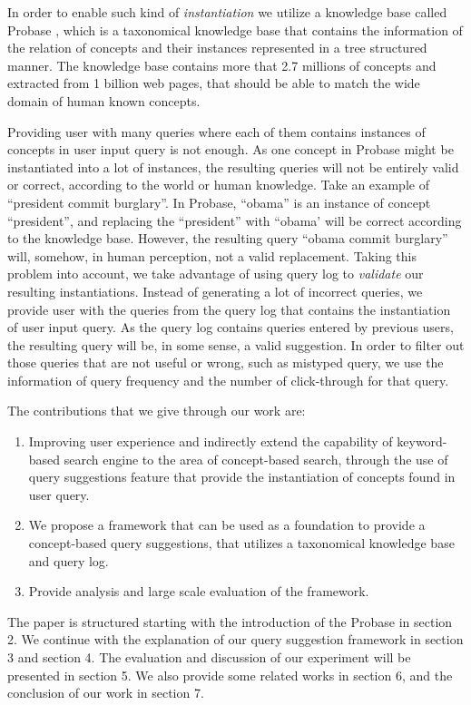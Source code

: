 In order to enable such kind of \textit{instantiation} we utilize 
a knowledge base called Probase \cite{website:Probase}, which is a 
taxonomical knowledge base that contains the information of the 
relation of concepts and their instances represented in a tree 
structured manner. The knowledge base contains more that 2.7 millions 
of concepts and extracted from 1 billion web pages, that should be 
able to match the wide domain of human known concepts.

Providing user with many queries where each of them contains 
instances of concepts in user input query is not enough. As one 
concept in Probase might be instantiated into a lot of instances, 
the resulting queries will not be entirely valid or correct, 
according to the world or human knowledge. Take an example of 
``president commit burglary''. In Probase, ``obama'' is an instance
of concept ``president'', and replacing the ``president'' with 
``obama' will be correct according to the knowledge base. However, 
the resulting query ``obama commit burglary'' will, somehow, in 
human perception, not a valid replacement. Taking this problem 
into account, we take advantage of using query log to 
\textit{validate} our resulting instantiations. Instead of 
generating a lot of incorrect queries, we provide user with 
the queries from the query log that contains the instantiation 
of user input query. As the query log contains queries entered 
by previous users, the resulting query will be, in some sense, 
a valid suggestion. In order to filter out those queries that 
are not useful or wrong, such as mistyped query, we use the 
information of query frequency and the number of click-through 
for that query.

The contributions that we give through our work are: 
\begin{enumerate}
\item 
Improving user experience and indirectly extend the capability of 
keyword-based search engine to the area of concept-based search, 
through the use of query suggestions feature that provide the 
instantiation of concepts found in user query.
\item
We propose a framework that can be used as a foundation to provide 
a concept-based query suggestions, that utilizes a taxonomical 
knowledge base and query log.
\item
Provide analysis and large scale evaluation of the framework.
\end{enumerate}

The paper is structured starting with the introduction of the Probase 
in section 2. We continue with the explanation of our query 
suggestion framework in section 3 and section 4. The evaluation 
and discussion of our experiment will be presented in section 5. 
We also provide some related works in section 6, and the conclusion 
of our work in section 7.

